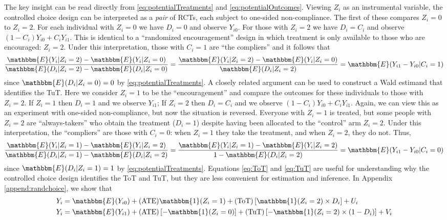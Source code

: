 \documentclass[oneside,11pt]{article}
\begin{document}
The key insight can be read directly from \eqref{eq:potentialTreatments} and \eqref{eq:potentialOutcomes}. 
Viewing $Z_i$ as an instrumental variable, the controlled choice design can be interpreted as a \emph{pair} of RCTs, each subject to one-sided non-compliance.
The first of these compares $Z_i=0$ to $Z_i = 2$. For each individual with $Z_i = 0$ we have $D_i = 0$ and observe $Y_{i0}$. For those with $Z_i = 2$ we have $D_i = C_i$ and observe $(1 - C_i) Y_{i0} + C_i Y_{i1}$. This is identical to a ``randomized encouragement'' design in which treatment is only available to those who are encouraged: $Z_i = 2$. Under this interpretation, those with $C_i = 1$ are ``the compliers'' and it follows that 
\begin{equation}
\frac{\mathbbm{E}(Y_i|Z_i=2) - \mathbbm{E}(Y_i|Z_i =0)}{\mathbbm{E}(D_i|Z_i=2)-\mathbbm{E}(D_i|Z_i=0)} = 
\frac{\mathbbm{E}(Y_i|Z_i=2) - \mathbbm{E}(Y_i|Z_i =0)}{\mathbbm{E}(D_i|Z_i=2)} = \mathbbm{E}(Y_{i1} - Y_{i0}|C_i = 1)
\label{eq:ToT}
\end{equation}
since $\mathbbm{E}(D_i|Z_i=0)=0$ by \eqref{eq:potentialTreatments}. 
A closely related argument can be used to construct a Wald estimand that identifies the TuT. Here we consider $Z_i = 1$ to be the ``encouragement'' and compare the outcomes for these individuals to those with $Z_i = 2$. If $Z_i = 1$ then $D_i = 1$ and we observe $Y_{i1}$; If $Z_i = 2$ then $D_i = C_i$ and we observe $(1 - C_i) Y_{i0} + C_i Y_{i1}$. Again, we can view this as an experiment with one-sided non-compliance, but now the situation is reversed. Everyone with $Z_i = 1$ is treated, but some people with $Z_i = 2$ are ``always-takers'' who obtain the treatment ($D_i = 1$) despite having been allocated to the ``control'' arm $Z_i=2$. Under this interpretation, the ``compliers'' are those with $C_i = 0$: when $Z_i=1$ they take the treatment, and when $Z_i=2$, they do not. Thus, 
\begin{equation}
\frac{\mathbbm{E}(Y_i|Z_i=1) - \mathbbm{E}(Y_i|Z_i =2)}{\mathbbm{E}(D_i|Z_i=1)-\mathbbm{E}(D_i|Z_i=2)} = 
\frac{\mathbbm{E}(Y_i|Z_i=1) - \mathbbm{E}(Y_i|Z_i =2)}{1 - \mathbbm{E}(D_i|Z_i=2)} = \mathbbm{E}(Y_{i1} - Y_{i0} | C_i = 0)
\label{eq:TuT}
\end{equation}
since $\mathbbm{E}(D_i|Z_i = 1)= 1$ by \eqref{eq:potentialTreatments}. Equations \eqref{eq:ToT} and \eqref{eq:TuT} are useful for understanding why the controlled choice design identifies the ToT and TuT, but they are less convenient for estimation and inference. 
In Appendix \ref{append:randchoice}, we show that
\begin{align}
\label{eq:ToTreg}
Y_i &= \mathbbm{E}(Y_{i0}) + (\text{ATE}) \mathbbm{1}(Z_i = 1) + (\text{ToT}) \left[\mathbbm{1}(Z_i = 2) \times D_i\right] + U_i \\
\label{eq:TuTreg}
Y_i &= \mathbbm{E}(Y_{i1}) + (\text{ATE}) \left[ -\mathbbm{1}(Z_i = 0)\right] + (\text{TuT}) \left[ -\mathbbm{1}(Z_i = 2) \times (1 - D_i)\right] + V_i 
\end{align}
\end{document}
